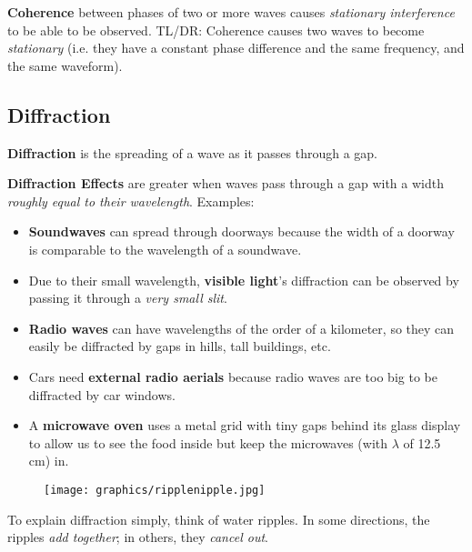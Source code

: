 \documentclass[12pt,a4paper]{article}
\begin{document}
\bigskip \noindent
\textbf{Coherence} between phases of two or more waves causes \textit{stationary interference} to be able to be observed. TL/DR: Coherence causes two waves to become \textit{stationary} (i.e. they have a constant phase difference and the same frequency, and the same waveform).
\subsection{Diffraction}
\textbf{Diffraction} is the spreading of a wave as it passes through a gap. 

\smallskip \noindent 
\textbf{Diffraction Effects} are greater when waves pass through a gap with a width \textit{roughly equal to their wavelength}. Examples:
\begin{itemize}
    \item \textbf{Soundwaves} can spread through doorways because the width of a doorway is comparable to the wavelength of a soundwave. 
    \item Due to their small wavelength, \textbf{visible light}'s diffraction can be observed by passing it through a \textit{very small slit}.
    \item \textbf{Radio waves} can have wavelengths of the order of a kilometer, so they can easily be diffracted by gaps in hills, tall buildings, etc.
    \item Cars need \textbf{external radio aerials} because radio waves are too big to be diffracted by car windows.
    \item A \textbf{microwave oven} uses a metal grid with tiny gaps behind its glass display to allow us to see the food inside but keep the microwaves (with $\lambda$ of 12.5 cm) in.
\end{itemize}

\begin{figure}[h]
\texttt{[image: graphics/ripplenipple.jpg]}
\centering
\end{figure}

To explain diffraction simply, think of water ripples. In some directions, the ripples \textit{add together}; in others, they \textit{cancel out}.
\end{document}

